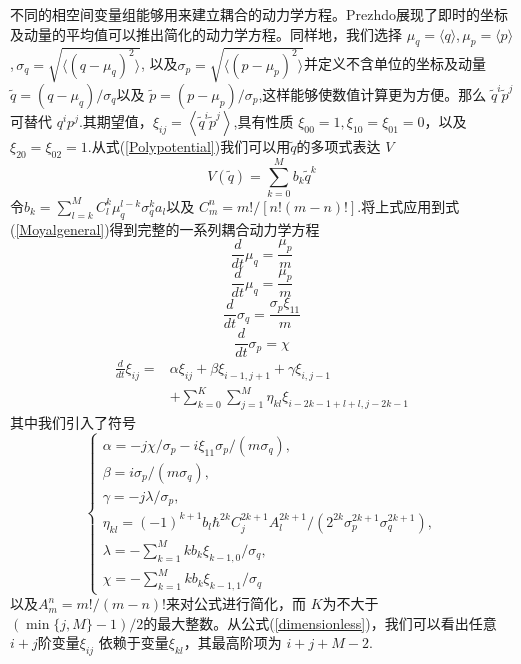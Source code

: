 不同的相空间变量组能够用来建立耦合的动力学方程。Prezhdo展现了即时的坐标及动量的平均值可以推出简化的动力学方程。同样地，我们选择 $\mu_q=\langle q \rangle $,\,$\mu_p = \langle p \rangle $,\,$\sigma_q = \sqrt{\langle (q-\mu_q)^2 \rangle }$, 以及$\sigma_p = \sqrt{\langle (p-\mu_p)^2 \rangle }$并定义不含单位的坐标及动量 $\tilde{q}=\left(q-\mu_{q}\right) / \sigma_{q}$以及 $\tilde{p}=\left(p-\mu_{p}\right) / \sigma_{p}$,这样能够使数值计算更为方便。那么 $\tilde{q}^{i} \tilde{p}^{j}$可替代 $q^{i} p^{j}$.其期望值，$\xi_{i j}=\left\langle\tilde{q}^{i} \tilde{p}^{j}\right\rangle$,具有性质 $\xi_{00}=1, \xi_{10}=\xi_{01}=0$，以及 $\xi_{20}=\xi_{02}=1$.从式(\ref{Polypotential})我们可以用$\tilde{q}$的多项式表达 $V$ 
\begin{equation}
	V(\tilde{q})=\sum_{k=0}^{M} b_{k} \tilde{q}^{k}
\end{equation}
令$b_{k}=\sum_{l=k}^{M} C_{l}^{k} \mu_{q}^{l-k} \sigma_{q}^{k} a_{l}$以及 $C_{m}^{n}=m ! /[n !(m-n) !]$.将上式应用到式(\ref{Moyalgeneral})得到完整的一系列耦合动力学方程
\begin{equation}
	\frac{d}{d t} \mu_{q}=\frac{\mu_{p}}{m}
	\label{muq}
\end{equation}
\begin{equation}
	\frac{d}{d t} \mu_{q}=\frac{\mu_{p}}{m}
\end{equation}
\begin{equation}
	\frac{d}{d t} \sigma_{q}=\frac{\sigma_{p} \xi_{11}}{m}
\end{equation}
\begin{equation}
	\frac{d}{d t} \sigma_{p}=\chi
\end{equation}
\begin{equation}
	\begin{aligned} \frac{d}{d t} \xi_{i j}=& \alpha \xi_{i j}+\beta \xi_{i-1, j+1}+\gamma \xi_{i, j-1} \\ &+\sum_{k=0}^{K} \sum_{j=1}^{M} \eta_{k l} \xi_{i-2 k-1+l+l, j-2 k-1} \end{aligned}
	\label{dimensionless}
\end{equation}
其中我们引入了符号
\begin{equation*}
	\begin{cases}
	\alpha=-j \chi / \sigma_{p}-i \xi_{11} \sigma_{p} / (m\sigma_q),\\
	\beta=i \sigma_{p} /\left(m \sigma_{q}\right),\\
	 \gamma=-j \lambda / \sigma_{p}, \\
	 \eta_{k l}=(-1)^{k+1} b_{l}\hbar^{2 k} C_{j}^{2 k+1} A_{l}^{2 k+1} /\left(2^{2 k} \sigma_{p}^{2 k+1} \sigma_{q}^{2 k+1}\right),\\
	 \lambda=-\sum_{k=1}^{M} k b_{k} \xi_{k-1,0} / \sigma_{q}, \\
	 \chi=-\sum_{k=1}^{M} k b_{k} \xi_{k-1,1} / \sigma_{q} 
	\end{cases}
\end{equation*}
以及$A_{m}^{n}=m ! /(m-n) !$来对公式进行简化，而 $K$为不大于 $(\min \{j, M\}-1) / 2$的最大整数。从公式(\ref{dimensionless})，我们可以看出任意$i+j$阶变量$\xi_{ij}$ 依赖于变量$\xi_{kl}$，其最高阶项为 $i+j+M-2$.

